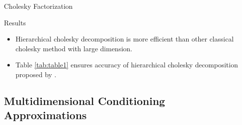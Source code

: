\begin{frame}{Cholesky Factorization}

\begin{table}[h]
	\centering
	\caption{Excution times for Cholesky factorization}
	\label{tab:table1}
\end{table}

\begin{block}{Results}
	\begin{itemize}
		\item Hierarchical cholesky decomposition is more efficient than other classical cholesky method with large dimension.
		\item Table \ref{tab:table1} ensures accuracy of hierarchical cholesky decomposition proposed by \citet{hackbusch2015hierarchical}.
	\end{itemize}
\end{block}

\end{frame}

\subsection{Multidimensional Conditioning Approximations}

